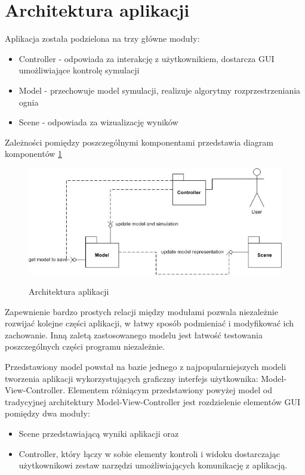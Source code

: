 \section {Architektura aplikacji}
Aplikacja została podzielona na trzy główne moduły:
\begin{itemize}
\item Controller - odpowiada za interakcję z użytkownikiem, dostarcza GUI umożliwiające kontrolę symulacji
\item Model - przechowuje model symulacji, realizuje algorytmy rozprzestrzeniania ognia
\item Scene - odpowiada za wizualizację wyników
\end{itemize}
Zależności pomiędzy poszczególnymi komponentami przedstawia diagram komponentów \ref{architektura aplikacji}
\begin{figure}
\begin {center}
\includegraphics{architectureComponentDiagram.jpg} \\
\caption { Architektura aplikacji}
\label {architektura aplikacji}
\end {center}
\end{figure}
Zapewnienie bardzo prostych relacji między modułami pozwala niezależnie rozwijać kolejne części aplikacji, w łatwy
sposób podmieniać i modyfikować ich zachowanie. Inną zaletą zastosowanego modelu jest łatwość
testowania poszczególnych części programu niezależnie.

Przedstawiony model powstał na bazie jednego z najpopularniejszych modeli tworzenia aplikacji wykorzystujących graficzny interfejs użytkownika: Model-View-Controller. Elementem różniącym przedstawiony powyżej model od tradycyjnej architektury Model-View-Controller
jest rozdzielenie elementów GUI pomiędzy dwa moduły:
\begin{itemize}
\item Scene przedstawiającą wyniki aplikacji oraz
\item Controller, który łączy w sobie elementy kontroli i widoku dostarczając użytkownikowi zestaw narzędzi umożliwiających komunikację z aplikacją.
\end {itemize}
